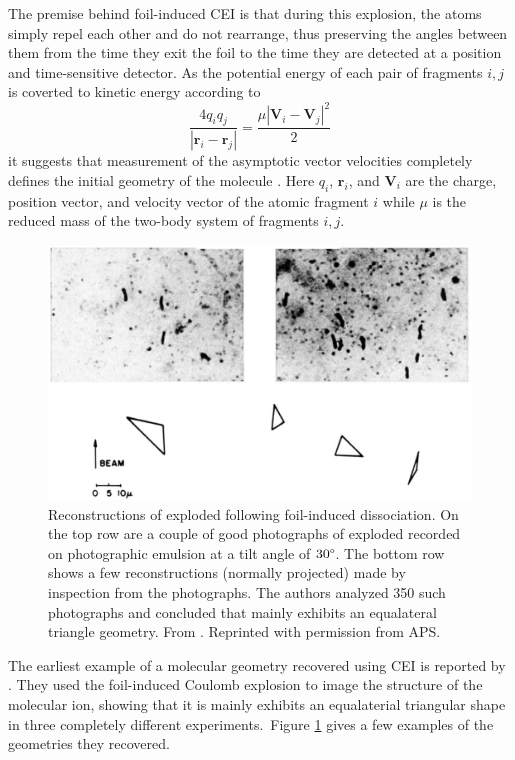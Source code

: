 The premise behind foil-induced CEI is that during this explosion, the atoms simply repel each other and do not rearrange, thus preserving the angles between them from the time they exit the foil to the time they are detected at a position and time-sensitive detector. As the potential energy of each pair of fragments $i,j$ is coverted to kinetic energy according to
\begin{equation}\label{eq:foilCEI}
\frac{4q_i q_j}{|\mathbf{r}_i - \mathbf{r}_j|} = \frac{\mu|\mathbf{V}_i - \mathbf{V}_j|^2}{2}
\end{equation}
it suggests that measurement of the asymptotic vector velocities completely defines the initial geometry of the molecule \citep{Vager89}. Here $q_i$, $\mathbf{r}_i$, and $\mathbf{V}_i$ are the charge, position vector, and velocity vector of the atomic fragment $i$ while $\mu$ is the reduced mass of the two-body system of fragments $i,j$.

\begin{figure}[H]
  \centering
  \includegraphics[width=\textwidth]{gfx/HydrogenTrimerReconstruction}
  \caption[Reconstructions of exploded  following foil-induced dissociation.]
  {Reconstructions of exploded  following foil-induced dissociation. On the top row are a couple of good photographs of exploded  recorded on photographic emulsion at a tilt angle of $30\degree$. The bottom row shows a few reconstructions (normally projected) made by inspection from the photographs. The authors analyzed 350 such photographs and concluded that  mainly exhibits an equalateral triangle geometry. From \citet{Gaillard78}. Reprinted with permission from APS.}
  \label{fig:hydrogenTrimer}
\end{figure}

The earliest example of a molecular geometry recovered using CEI is reported by \citet{Gaillard78}. They used the foil-induced Coulomb explosion to image the structure of the  molecular ion, showing that it is mainly exhibits an equalaterial triangular shape in three completely different experiments.\footnotemark ~Figure \ref{fig:hydrogenTrimer} gives a few examples of the geometries they recovered.

